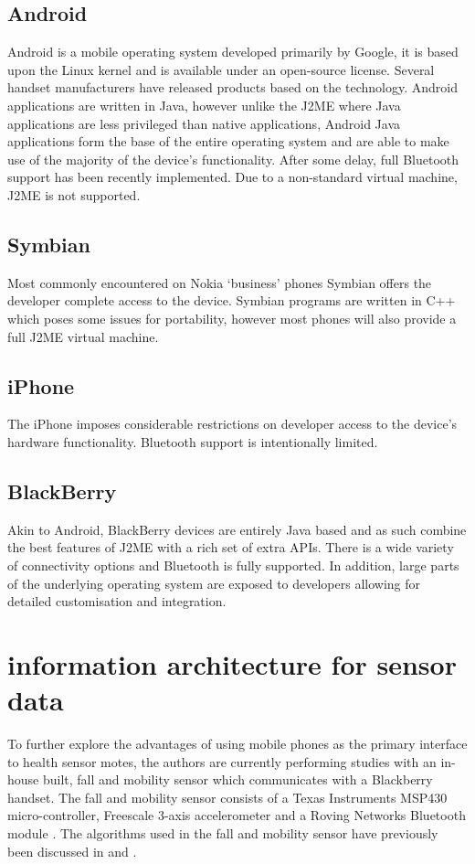 \documentclass[conference,a4paper]{IEEEtran}
\begin{document}
\subsection{Android}
Android is a mobile operating system developed primarily by Google, it is based upon the Linux kernel and is available under an open-source license.
Several handset manufacturers have released products based on the technology.
Android applications are written in Java, however unlike the J2ME where Java applications are less privileged than native applications, Android Java applications form the base of the entire operating system and are able to make use of the majority of the device's functionality.
After some delay, full Bluetooth support has been recently implemented. Due to a non-standard virtual machine, J2ME is not supported.

\subsection{Symbian}
Most commonly encountered on Nokia `business' phones Symbian offers the developer complete access to the device.
Symbian programs are written in C++ which poses some issues for portability, however most phones will also provide a full J2ME virtual machine.

\subsection{iPhone}
The iPhone imposes considerable restrictions on developer access to the device's hardware functionality. Bluetooth support is intentionally limited.

\subsection{BlackBerry}
Akin to Android, BlackBerry devices are entirely Java based and as such combine the best features of J2ME with a rich set of extra APIs.
There is a wide variety of connectivity options and Bluetooth is fully supported.
In addition, large parts of the underlying operating system are exposed to developers allowing for detailed customisation and integration.


\section{information architecture for sensor data\label{Interface.sec}}
To further explore the advantages of using mobile phones as the primary interface to health sensor motes, the authors are currently performing studies with an in-house built, fall and mobility sensor which communicates with a Blackberry handset. The fall and mobility sensor consists of a Texas Instruments MSP430 micro-controller, Freescale 3-axis accelerometer and a Roving Networks Bluetooth module \cite{VandeVen2009}. The algorithms used in the fall and mobility sensor have previously been discussed in \cite{BourkeCan1} and \cite{BourkeCan2}.
\end{document}
